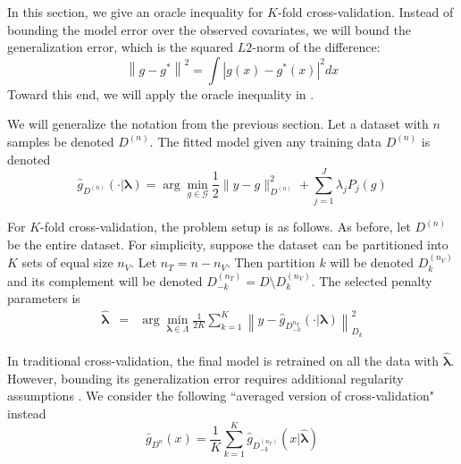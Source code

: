 \documentclass[12pt]{article}
\begin{document}
In this section, we give an oracle inequality for $K$-fold cross-validation. Instead of bounding the model error over the observed covariates, we will bound the generalization error, which is the squared $L2$-norm of the difference:
\begin{equation}
\left \| g - g^* \right \|^2 = \int \left |g(x) - g^*(x) \right |^2 dx
\end{equation}
Toward this end, we will apply the oracle inequality in \citet{lecue2012oracle}.

We will generalize the notation from the previous section. Let a dataset with $n$ samples be denoted $D^{(n)}$. The fitted model given any training data $D^{(n)}$ is denoted
\begin{equation}
\hat{g}_{D^{(n)}}(\cdot | \boldsymbol \lambda)= \arg\min_{g\in\mathcal{G}} \frac{1}{2} \| y-g \|_{D^{(n)}}^{2} + \sum_{j=1}^J \lambda_j P_j(g)
\end{equation}

For $K$-fold cross-validation, the problem setup is as follows. As before, let $D^{(n)}$ be the entire dataset. For simplicity, suppose the dataset can be partitioned into $K$ sets of equal size $n_V$. Let $n_T = n - n_V$. Then partition $k$ will be denoted $D_k^{(n_V)}$ and its complement will be denoted $D_{-k}^{(n_T)} = D \setminus D_k^{(n_V)}$. The selected penalty parameters is
\begin{eqnarray}
\label{kfold_opt}
\hat{\boldsymbol \lambda} &=& \arg\min_{\boldsymbol{\lambda} \in\Lambda} \frac{1}{2K} \sum_{k=1}^K  \left \| y-\hat{g}_{D_{-k}^{n_T}}(\cdot | \boldsymbol \lambda) \right \|_{D_k}^{2}
\end{eqnarray}

In traditional cross-validation, the final model is retrained on all the data with $\hat{\boldsymbol{\lambda}}$. However, bounding its generalization error requires additional regularity assumptions \citep{lecue2012oracle}. We consider the following ``averaged version of cross-validation" instead
\begin{equation}
\bar{g}_{D^{n}}(x) = \frac{1}{K} \sum_{k=1}^K \hat{g}_{D^{(n_T)}_{-k}}
(x | \hat{\boldsymbol \lambda})
\end{equation}
\end{document}
